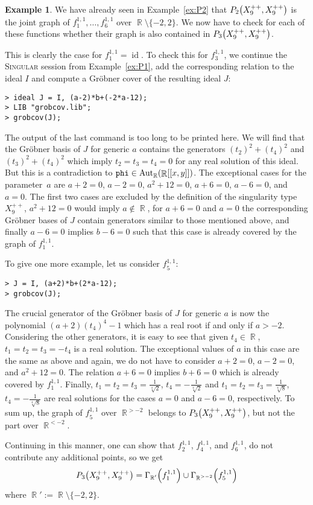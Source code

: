 \documentclass[noend]{amsproc}
\theoremstyle{definition}
\newtheorem{example}[theorem]{Example}
\let\originalleft\left
\let\originalright\right
\renewcommand{\left}{\mathopen{}\mathclose\bgroup\originalleft}
\renewcommand{\right}{\aftergroup\egroup\originalright}
\newcommand{\Singular}{\textsc{Singular}}
\DeclareMathOperator{\R}{\mathbb{R}}
\DeclareMathOperator{\Aut}{Aut}
\DeclareMathOperator{\id}{id}
\begin{document}
\begin{example}
We have already seen in Example~\ref{ex:P2} that
$P_2\left(X_9^{++}, X_9^{++}\right)$ is the joint graph of
$f_1^{1,1}, \ldots, f_6^{1,1}$ over $\R \setminus \{-2, 2\}$. We now have to
check for each of these functions whether their graph is also contained in
$P_3\left(X_9^{++}, X_9^{++}\right)$.

This is clearly the case for $f_1^{1,1} = \id$. To check this for $f_3^{1,1}$,
we continue the \Singular{} session from Example~\ref{ex:P1}, add the
corresponding relation to the ideal $I$ and compute a Gr\"obner cover of the
resulting ideal $J$:
\begin{verbatim}
> ideal J = I, (a-2)*b+(-2*a-12);
> LIB "grobcov.lib";
> grobcov(J);
\end{verbatim}
The output of the last command is too long to be printed here. We will find
that the Gr\"obner basis of $J$ for generic $a$ contains the generators
$(t_2)^2+(t_4)^2$ and $(t_3)^2+(t_4)^2$ which imply $t_2 = t_3 = t_4 = 0$ for
any real solution of this ideal. But this is a contradiction to
$\verb+phi+ \in \Aut_{\R}(\R[[x,y]])$. The exceptional cases for the
parameter~$a$ are $a+2=0$, $a-2=0$, $a^2+12=0$, $a+6=0$, $a-6=0$, and $a=0$.
The first two cases are excluded by the definition of the singularity type
$X_9^{++}$, $a^2+12=0$ would imply $a \not\in \R$, for $a+6=0$ and $a=0$ the
corresponding Gr\"obner bases of $J$ contain generators similar to those
mentioned above, and finally $a-6=0$ implies $b-6=0$ such that this case is
already covered by the graph of $f_1^{1,1}$.

To give one more example, let us consider $f_5^{1,1}$:
\begin{verbatim}
> J = I, (a+2)*b+(2*a-12);
> grobcov(J);
\end{verbatim}
The crucial generator of the Gr\"obner basis of $J$ for generic $a$ is now the
polynomial $(a+2)(t_4)^4-1$ which has a real root if and only if $a > -2$.
Considering the other generators, it is easy to see that given $t_4 \in \R$,
$t_1 = t_2 = t_3 = -t_4$ is a real solution. The exceptional values
of $a$ in this case are the same as above and again, we do not have to consider
$a+2=0$, $a-2=0$, and $a^2+12=0$. The relation $a+6=0$ implies $b+6=0$ which is
already covered by $f_1^{1,1}$. Finally,
$t_1 = t_2 = t_3 = \frac{1}{\sqrt[4]{2}}$, $t_4 = -\frac{1}{\sqrt[4]{2}}$ and
$t_1 = t_2 = t_3 = \frac{1}{\sqrt[4]{8}}$, $t_4 = -\frac{1}{\sqrt[4]{8}}$ are
real solutions for the cases $a=0$ and $a-6=0$, respectively. To sum up,
the graph of $f_5^{1,1}$ over $\R^{>-2}$ belongs to
$P_3\left(X_9^{++}, X_9^{++}\right)$, but not the part over $\R^{<-2}$.

Continuing in this manner, one can show that $f_2^{1,1}$, $f_4^{1,1}$, and
$f_6^{1,1}$, do not contribute any additional points, so we get
\[
P_3\left(X_9^{++}, X_9^{++}\right) = \Gamma_{\R'} \left(f_1^{1,1}\right)
\cup \Gamma_{\R^{>-2}} \left(f_5^{1,1}\right)
\]
where $\R' := \R \setminus \{-2, 2\}$.
\end{example}
\end{document}
